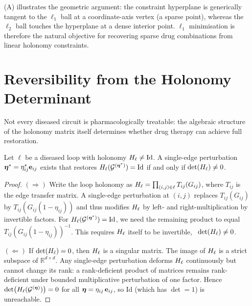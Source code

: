 \begin{remark}
(A) illustrates the geometric argument: the
constraint hyperplane is generically tangent to the $\ell_1$ ball at a
coordinate-axis vertex (a sparse point), whereas the $\ell_2$ ball touches the
hyperplane at a dense interior point.  $\ell_1$ minimisation is therefore the
natural objective for recovering sparse drug combinations from linear holonomy
constraints.
\end{remark}

\section{Reversibility from the Holonomy Determinant}
\label{sec:reversibility}

Not every diseased circuit is pharmacologically treatable: the algebraic
structure of the holonomy matrix itself determines whether drug therapy can
achieve full restoration.

\begin{theorem}
\label{thm:reversibility}
Let $\ell$ be a diseased loop with holonomy $H_\ell \neq \mathrm{Id}$.
A single-edge perturbation $\boldsymbol{\eta}^* = \eta_{ij}^* \mathbf{e}_{ij}$ exists
that restores $H_\ell(\mathcal{G}^{(\boldsymbol{\eta}^*)}) = \mathrm{Id}$ if and only if
$\det(H_\ell) \neq 0$.
\end{theorem}

\begin{proof}
$(\Rightarrow)$
Write the loop holonomy as $H_\ell = \prod_{(i,j)\in\ell} T_{ij}(G_{ij})$,
where $T_{ij}$ is the edge transfer matrix.  A single-edge perturbation at
$(i,j)$ replaces $T_{ij}(G_{ij})$ by $T_{ij}(G_{ij}(1-\eta_{ij}))$ and
thus modifies $H_\ell$ by left- and right-multiplication by invertible factors.
For $H_\ell(\mathcal{G}^{(\boldsymbol{\eta}^*)}) = \mathrm{Id}$, we need the remaining
product to equal $T_{ij}(G_{ij}(1-\eta_{ij}))^{-1}$.  This requires
$H_\ell$ itself to be invertible, \ie\ $\det(H_\ell) \neq 0$.

$(\Leftarrow)$
If $\det(H_\ell) = 0$, then $H_\ell$ is a singular matrix.  The image of $H_\ell$
is a strict subspace of $\mathbb{R}^{d\times d}$.  Any single-edge perturbation
deforms $H_\ell$ continuously but cannot change its rank: a rank-deficient product
of matrices remains rank-deficient under bounded multiplicative perturbation of
one factor.  Hence $\det(H_\ell(\mathcal{G}^{(\boldsymbol{\eta})})) = 0$ for all
$\boldsymbol{\eta} = \eta_{ij}\,\mathbf{e}_{ij}$, so $\mathrm{Id}$ (which has
$\det = 1$) is unreachable.
\end{proof}

